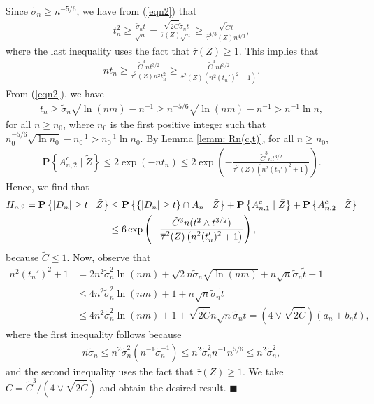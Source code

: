 \documentclass[12pt, fullpage]{amsart}
\theoremstyle{definition}
\theoremstyle{definition}
\theoremstyle{definition}
\begin{document}
\begin{bibunit}[econometrica]
Since $\tilde \sigma_n \ge n^{-5/6}$, we have from (\ref{eqn2}) that
\begin{align}
	\label{ineq32}
    t_n^2 \ge \frac{ \tilde \sigma_n \tilde t}{\sqrt{n}} = \frac{\sqrt{2\tilde C} \tilde \sigma_n t}{ \overline \tau(Z) \sqrt{n}} \ge \frac{\sqrt{\tilde C} t}{\overline \tau^{4/3}(Z) n^{4/3}},
\end{align}
where the last inequality uses the fact that $\overline \tau(Z) \ge 1$. This implies that 
\begin{align*}
	n t_n \ge \frac{\tilde C^3 n t^{3/2}}{\overline \tau^2(Z) n^2 t_n^2} \ge \frac{\tilde C^3 n t^{3/2}}{\overline \tau^2(Z) \left(n^2 (t_n')^2 + 1\right)}.
\end{align*}
From (\ref{eqn2}), we have 
\begin{align*}
	t_n \ge \tilde \sigma_n \sqrt{\ln(nm)} - n^{-1} \ge n^{-5/6} \sqrt{\ln(nm)} - n^{-1} > n^{-1} \ln n,
\end{align*}
for all $n \ge n_0$, where $n_0$ is the first positive integer such that $n_0^{-5/6} \sqrt{\ln n_0} - n_0^{-1}> n_0^{-1} \ln n_0$. By Lemma \ref{lemm: Rn(c,t)}, for all $n \ge n_0$,
\begin{align*}
	\mathbf{P}\left\{ A_{n,2}^c \mid \tilde Z \right\} \le 2 \exp(- n t_n) \le 2\exp\left( -\frac{\tilde C^3 n t^{3/2}}{\overline \tau^2(Z) \left(n^2 (t_n')^2 + 1\right)} \right).
\end{align*}
Hence, we find that 
\begin{align}
	\label{H_{n,2}}
	H_{n,2} = \mathbf{P}\left\{|D_n| \ge t \mid \tilde Z  \right\} &\le \mathbf{P}\left\{\{|D_n| \ge t \} \cap A_n \mid \tilde Z \right\} + \mathbf{P}\left\{A_{n,1}^c \mid \tilde Z \right\} + \mathbf{P}\left\{A_{n,2}^c \mid \tilde Z \right\}\\ \notag
	&\le 6 \exp\left(-\frac{\tilde  C^3 n (t^2 \wedge t^{3/2})}{\displaystyle \overline \tau^2(Z) \left(n^2 (t_n')^2 + 1\right)} \right),
\end{align}
because $\tilde C \le 1$. Now, observe that 
\begin{align*}
	n^2(t_n')^2 + 1 &= 2 n^2 \tilde \sigma_n^2 \ln(n m) + \sqrt{2} n \tilde \sigma_n \sqrt{\ln(n m)} + n \sqrt{n} \tilde \sigma_n \tilde t + 1 \\
	&\le 4 n^2 \tilde \sigma_n^2 \ln(n m) +1 + n \sqrt{n} \tilde \sigma_n \tilde t \\
	&\le 4 n^2 \tilde \sigma_n^2 \ln(n m) +1 + \sqrt{2 \tilde C} n \sqrt{n} \tilde \sigma_n t = (4 \vee \sqrt{2 \tilde C})(a_n + b_n t),
\end{align*}
where the first inequality follows because 
\begin{align*}
	n \tilde \sigma_n \le n^2 \tilde \sigma_n^2 (n^{-1} \tilde \sigma_n^{-1}) \le n^2 \tilde \sigma_n^2 n^{-1} n^{5/6} \le n^2 \tilde \sigma_n^2,
\end{align*}
and the second inequality uses the fact that $\overline \tau(Z) \ge 1$. We take $C = \tilde C^3 /(4 \vee \sqrt{2 \tilde C})$ and obtain the desired result. $\blacksquare$\medskip


\end{bibunit}
\end{document}
